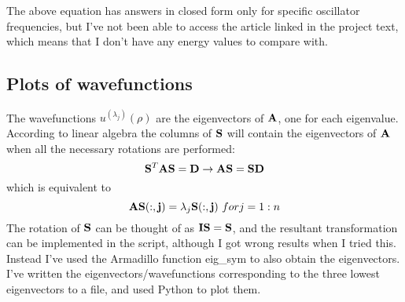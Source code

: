 \documentclass[a4paper,12pt, english]{article}
\begin{document}
The above equation has answers in closed form only for specific oscillator frequencies, 
but I've not been able to access the article linked in the project text, which means that I 
don't have any energy values to compare with. 

\subsection*{Plots of wavefunctions}
The wavefunctions $u^{(\lambda_j)}(\rho)$ are the eigenvectors of ${\bf A}$, one for each eigenvalue. 
According to linear algebra the columns of ${\bf S}$ will contain the eigenvectors of ${\bf A}$ when 
all the necessary rotations are performed:
\[   
   {\bf S}^T {\bf A} {\bf S} = {\bf D} \rightarrow {\bf A} {\bf S} = {\bf S} {\bf D}
\]
which is equivalent to
\[
   {\bf A}{\bf S(:,j)} = \lambda_j{\bf S(:,j)} \ for j = 1:n
\]
The rotation of ${\bf S}$ can be thought of as ${\bf I}{\bf S} = {\bf S}$, and the resultant transformation can be implemented in the script, although I got wrong results when I tried this. Instead I've used the Armadillo function 
eig_sym to also obtain the eigenvectors. I've written the eigenvectors/wavefunctions corresponding to 
the three lowest eigenvectors to a file, and used Python to plot them. 

\begin{figure}[hbt]
\begin{center}
\end{center}
\end{figure} 

\begin{figure}[hbt]
\begin{center}
\end{center}
\end{figure} 

\begin{figure}[hbt]
\begin{center}
\end{center}
\end{figure} 

\begin{figure}[hbt]
\begin{center}
\end{center}
\end{figure} 
\end{document}
